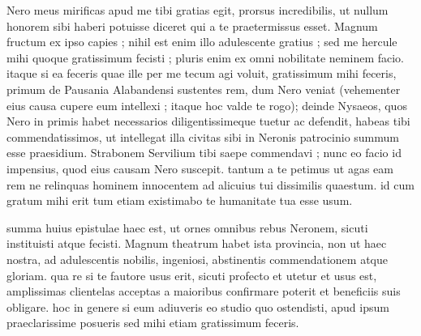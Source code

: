 


 Nero meus mirificas apud me tibi gratias egit, prorsus incredibilis, ut nullum honorem sibi haberi potuisse diceret qui a te praetermissus esset. Magnum fructum ex ipso capies ; nihil est enim illo adulescente gratius ; sed me hercule mihi quoque gratissimum fecisti ; pluris enim ex omni nobilitate neminem facio. itaque si ea feceris quae ille per me tecum agi voluit, gratissimum mihi feceris, primum de Pausania Alabandensi sustentes rem, dum Nero veniat (vehementer eius causa cupere eum intellexi ; itaque hoc valde te rogo); deinde Nysaeos, quos Nero in primis habet necessarios diligentissimeque tuetur ac defendit, habeas tibi commendatissimos, ut intellegat illa civitas sibi in Neronis patrocinio summum esse praesidium. Strabonem Servilium tibi saepe commendavi ; nunc eo facio id impensius, quod eius causam Nero suscepit. tantum a te petimus ut agas eam rem ne relinquas hominem innocentem ad alicuius tui dissimilis quaestum. id cum gratum mihi erit tum etiam existimabo te humanitate tua esse usum.

 summa huius epistulae haec est, ut ornes omnibus rebus Neronem, sicuti instituisti atque fecisti. Magnum theatrum habet ista provincia, non ut haec nostra, ad adulescentis nobilis, ingeniosi, abstinentis commendationem atque gloriam. qua re si te fautore usus erit, sicuti profecto et utetur et usus est, amplissimas clientelas acceptas a maioribus confirmare poterit et beneficiis suis obligare. hoc in genere si eum adiuveris eo studio quo ostendisti, apud ipsum praeclarissime posueris sed mihi etiam gratissimum feceris.

